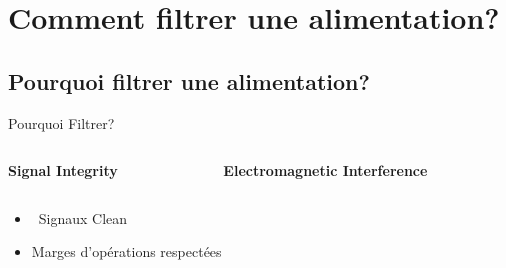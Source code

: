 
\section{Comment filtrer une alimentation?}


\subsection{Pourquoi filtrer une alimentation?}

\begin{frame}{Pourquoi Filtrer?}
    \vspace{-36pt}
    \begin{columns}
        \begin{column}{0.5\textwidth}
            \begin{center}
                \textbf{Signal Integrity}
            \end{center}
        \end{column}
        \begin{column}{0.5\textwidth}
            \begin{center}
                \textbf{Electromagnetic Interference}
            \end{center}
        \end{column}
    \end{columns}

    \begin{columns}
        \begin{column}{0.5\textwidth}
            \begin{itemize}
                \item[] \hspace{-20pt}\textcolor{UDSgreenFierte}{\faWater} ~Signaux Clean
                \item Marges d'opérations respectées
            \end{itemize}


\end{column}
\end{columns}
\end{frame}
